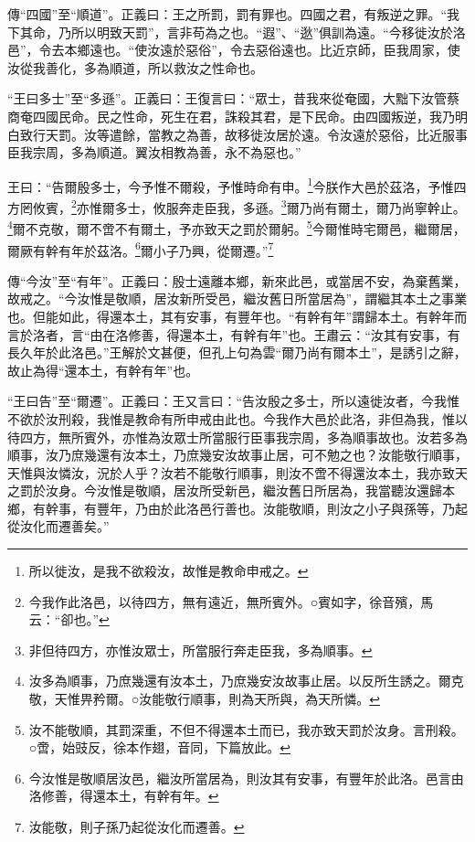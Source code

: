 {\noindent\zhuan{}\fzbyks 傳“四國”至“順道”。正義曰：王之所罰，罰有罪也。四國之君，有叛逆之罪。“我下其命，乃所以明致天罰”，言非苟為之也。“遐”、“逖”俱訓為遠。“今移徙汝於洛邑”，令去本鄉遠也。“使汝遠於惡俗”，令去惡俗遠也。比近京師，臣我周家，使汝從我善化，多為順道，所以救汝之性命也。 \par}

{\noindent\shu{}\fzkt “王曰多士”至“多遜”。正義曰：王復言曰：“眾士，昔我來從奄國，大黜下汝管蔡商奄四國民命。民之性命，死生在君，誅殺其君，是下民命。由四國叛逆，我乃明白致行天罰。汝等遣餘，當教之為善，故移徙汝居於遠。令汝遠於惡俗，比近服事臣我宗周，多為順道。翼汝相教為善，永不為惡也。” \par}

王曰：“告爾殷多士，今予惟不爾殺，予惟時命有申。\footnote{所以徙汝，是我不欲殺汝，故惟是教命申戒之。}今朕作大邑於茲洛，予惟四方罔攸賓，\footnote{今我作此洛邑，以待四方，無有遠近，無所賓外。○賓如字，徐音殯，馬云：“卻也。”}亦惟爾多士，攸服奔走臣我，多遜。\footnote{非但待四方，亦惟汝眾士，所當服行奔走臣我，多為順事。}爾乃尚有爾土，爾乃尚寧幹止。\footnote{汝多為順事，乃庶幾還有汝本土，乃庶幾安汝故事止居。以反所生誘之。爾克敬，天惟畀矜爾。○汝能敬行順事，則為天所與，為天所憐。}爾不克敬，爾不啻不有爾土，予亦致天之罰於爾躬。\footnote{汝不能敬順，其罰深重，不但不得還本土而已，我亦致天罰於汝身。言刑殺。○啻，始豉反，徐本作翅，音同，下篇放此。}今爾惟時宅爾邑，繼爾居，爾厥有幹有年於茲洛。\footnote{今汝惟是敬順居汝邑，繼汝所當居為，則汝其有安事，有豐年於此洛。邑言由洛修善，得還本土，有幹有年。}爾小子乃興，從爾遷。”\footnote{汝能敬，則子孫乃起從汝化而遷善。}


{\noindent\zhuan{}\fzbyks 傳“今汝”至“有年”。正義曰：殷士遠離本鄉，新來此邑，或當居不安，為棄舊業，故戒之。“今汝惟是敬順，居汝新所受邑，繼汝舊日所當居為”，謂繼其本土之事業也。但能如此，得還本土，其有安事，有豐年也。“有幹有年”謂歸本土。有幹年而言於洛者，言“由在洛修善，得還本土，有幹有年”也。王肅云：“汝其有安事，有長久年於此洛邑。”王解於文甚便，但孔上句為雲“爾乃尚有爾本土”，是誘引之辭，故止為得“還本土，有幹有年”也。 \par}

{\noindent\shu{}\fzkt “王曰告”至“爾遷”。正義曰：王又言曰：“告汝殷之多士，所以遠徙汝者，今我惟不欲於汝刑殺，我惟是教命有所申戒由此也。今我作大邑於此洛，非但為我，惟以待四方，無所賓外，亦惟為汝眾士所當服行臣事我宗周，多為順事故也。汝若多為順事，汝乃庶幾還有汝本土，乃庶幾安汝故事止居，可不勉之也？汝能敬行順事，天惟與汝憐汝，況於人乎？汝若不能敬行順事，則汝不啻不得還汝本土，我亦致天之罰於汝身。今汝惟是敬順，居汝所受新邑，繼汝舊日所居為，我當聽汝還歸本鄉，有幹事，有豐年，乃由於此洛邑行善也。汝能敬順，則汝之小子與孫等，乃起從汝化而遷善矣。” \par}

